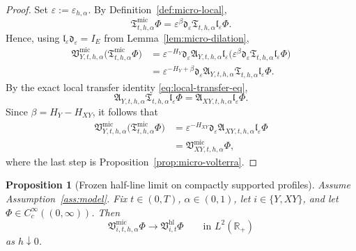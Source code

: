 \documentclass[11pt,a4paper]{amsart}
\theoremstyle{plain}
\newtheorem{proposition}[theorem]{Proposition}
\theoremstyle{definition}
\theoremstyle{remark}
\newcommand{\R}{\mathbb{R}}
\begin{document}
\begin{proof}
Set \(\varepsilon:=\varepsilon_{h,\alpha}\). By Definition~\ref{def:micro-local},
\[
\mathfrak T_{t,h,\alpha}^{\mathrm{mic}}\Phi
=
\varepsilon^\beta
\mathfrak d_{\varepsilon}
\mathfrak T_{t,h,\alpha}
\mathfrak l_{\varepsilon}\Phi.
\]
Hence, using \(\mathfrak l_{\varepsilon}\mathfrak d_{\varepsilon}=I_E\) from
Lemma~\ref{lem:micro-dilation},
\begin{align*}
\mathfrak V_{Y,t,h,\alpha}^{\mathrm{mic}}
\bigl(
\mathfrak T_{t,h,\alpha}^{\mathrm{mic}}\Phi
\bigr)
&=
\varepsilon^{-H_Y}
\mathfrak d_{\varepsilon}
\mathfrak A_{Y,t,h,\alpha}
\mathfrak l_{\varepsilon}
\bigl(
\varepsilon^\beta \mathfrak d_{\varepsilon}\mathfrak T_{t,h,\alpha}\mathfrak l_{\varepsilon}\Phi
\bigr) \\
&=
\varepsilon^{-H_Y+\beta}
\mathfrak d_{\varepsilon}
\mathfrak A_{Y,t,h,\alpha}
\mathfrak T_{t,h,\alpha}
\mathfrak l_{\varepsilon}\Phi.
\end{align*}
By the exact local transfer identity \eqref{eq:local-transfer-eq},
\[
\mathfrak A_{Y,t,h,\alpha}\mathfrak T_{t,h,\alpha}
\mathfrak l_{\varepsilon}\Phi
=
\mathfrak A_{XY,t,h,\alpha}\mathfrak l_{\varepsilon}\Phi.
\]
Since \(\beta=H_Y-H_{XY}\), it follows that
\begin{align*}
\mathfrak V_{Y,t,h,\alpha}^{\mathrm{mic}}
\bigl(
\mathfrak T_{t,h,\alpha}^{\mathrm{mic}}\Phi
\bigr)
&=
\varepsilon^{-H_{XY}}
\mathfrak d_{\varepsilon}
\mathfrak A_{XY,t,h,\alpha}
\mathfrak l_{\varepsilon}\Phi \\
&=
\mathfrak V_{XY,t,h,\alpha}^{\mathrm{mic}}\Phi,
\end{align*}
where the last step is Proposition~\ref{prop:micro-volterra}.
\end{proof}

\begin{proposition}[Frozen half-line limit on compactly supported profiles]
\label{prop:micro-volterra-limit}
Assume Assumption~\ref{ass:model}. Fix \(t\in(0,T)\), \(\alpha\in(0,1)\), let \(i\in\{Y,XY\}\),
and let \(\Phi\in C_c^\infty((0,\infty))\). Then
\begin{equation}\label{eq:micro-volterra-limit}
\mathfrak V_{i,t,h,\alpha}^{\mathrm{mic}}\Phi
\longrightarrow
\mathfrak V_{i,t}^{\mathrm{hl}}\Phi
\qquad\text{in }L^2(\R_+)
\end{equation}
as \(h\downarrow0\).
\end{proposition}
\end{document}

